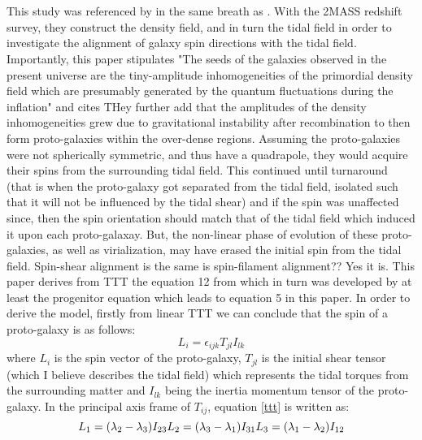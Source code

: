 \documentclass[fleqn,usenatbib]{mnras}
\begin{document}
\section{\citet{Lee_Erdogdu_07}}\label{Lee_Erdogdu_07}
This study was referenced by \citet{Trowland_13} in the same breath as \citet{Lee_pen_00}.
With the 2MASS redshift survey, they construct the density field, and in turn the tidal field in order to investigate the alignment of galaxy spin directions with the tidal field. 
Importantly, this paper stipulates "The seeds of the galaxies observed in the present universe are the tiny-amplitude inhomogeneities of the primordial density field which are presumably generated by the quantum fluctuations during the inflation" and cites \citet{Guth_82}
THey further add that the amplitudes of the density inhomogeneities grew due to gravitational instability after recombination to then form proto-galaxies within the over-dense regions. Assuming the proto-galaxies were not spherically symmetric, and thus have a quadrapole, they would acquire their spins from the surrounding tidal field. This continued until turnaround (that is when the proto-galaxy got separated from the tidal field, isolated such that it will not be influenced by the tidal shear) and if the spin was unaffected since, then the spin orientation should match that of the tidal field which induced it upon each proto-galaxay. But, the non-linear phase of evolution of these proto-galaxies, as well as virialization, may have erased the initial spin from the tidal field.
Spin-shear alignment is the same is spin-filament alignment?? Yes it is.
This paper derives from TTT the equation 12 from \citet{Trowland_13} which in turn was developed by \citet{Lee_05} at least the progenitor equation which leads to equation 5 in this paper. 
In order to derive the model, firstly from linear TTT we can conclude that the spin of a proto-galaxy is as follows:
\begin{equation}
L_{i}=\epsilon_{ijk}T_{jl}I_{lk} \label{ttt}
\end{equation}
where $L_{i}$ is the spin vector of the proto-galaxy, $T_{jl}$ is the initial shear tensor (which I believe describes the tidal field) which represents the tidal torques from the surrounding matter and $I_{lk}$ being the inertia momentum tensor of the proto-galaxy. In the principal axis frame of $T_{ij}$, equation \ref{ttt} is written as:
\begin{equation}
L_{1}=(\lambda_{2}-\lambda_{3})I_{23}\\
L_{2}=(\lambda_{3}-\lambda_{1})I_{31}\\ \label{prin}
L_{3}=(\lambda_{1}-\lambda_{2})I_{12}
\end{equation}
\end{document}
